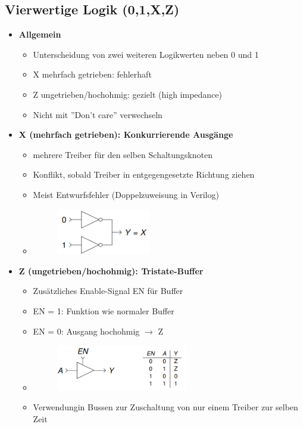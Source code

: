 \documentclass[11pt,a4paper]{article}
\begin{document}
\subsection{Vierwertige Logik (0,1,X,Z)}
\begin{itemize}

\item \textbf{Allgemein}
	\begin{itemize}
	\item Unterscheidung von zwei weiteren Logikwerten neben 0 und 1
	\item X mehrfach getrieben: fehlerhaft
	\item Z ungetrieben/hochohmig: gezielt (high impedance)
	\item Nicht mit ''Don't care'' verwechseln
	\end{itemize}

\item \textbf{X (mehrfach getrieben): Konkurrierende Ausgänge}
	\begin{itemize}
	\item mehrere Treiber für den selben Schaltungsknoten
	\item Konflikt, sobald Treiber in entgegengesetzte Richtung ziehen
	\item Meist Entwurfsfehler (Doppelzuweisung in Verilog)
	\item[] \begin{figure}[H]
				\begin{center}
				\includegraphics[height=2cm]{Bilder/mehrx}
				\end{center}
			\end{figure}
	\end{itemize}
	
\item \textbf{Z (ungetrieben/hochohmig): Tristate-Buffer}
	\begin{itemize}
	\item Zusätzliches Enable-Signal EN für Buffer
	\item EN = 1: Funktion wie normaler Buffer
	\item EN = 0: Ausgang hochohmig $\rightarrow$ Z
	\item[] \begin{figure}[H]
				\begin{center}
				\includegraphics[height=2cm]{Bilder/mehrz}
				\end{center}
			\end{figure}
	\item Verwendungin Bussen zur Zuschaltung von nur einem Treiber zur selben Zeit
	\end{itemize}
	

\end{itemize}
\end{document}
